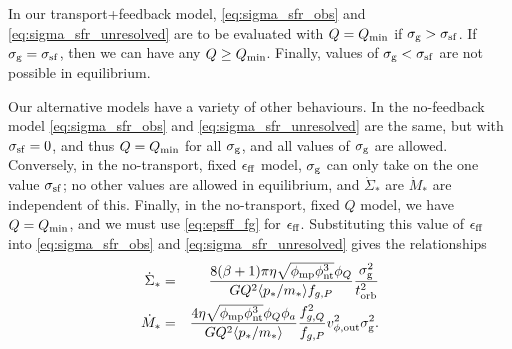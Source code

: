 \documentclass[useAMS,usenatbib]{mn2e}
\newcommand{\Qmin}{Q_{\rm min}}
\begin{document}
In our transport+feedback model, \autoref{eq:sigma_sfr_obs} and \autoref{eq:sigma_sfr_unresolved} are to be evaluated with $Q = \Qmin$ if $\sigma_{\rm g} > \sigma_{\rm sf}$. If $\sigma_{\rm g} = \sigma_{\rm sf}$, then we can have any $Q \geq Q_{\rm min}$. Finally, values of $\sigma_{\rm g} < \sigma_{\rm sf}$ are not possible in equilibrium.

Our alternative models have a variety of other behaviours. In the no-feedback model \autoref{eq:sigma_sfr_obs} and \autoref{eq:sigma_sfr_unresolved} are the same, but with $\sigma_{\rm sf} = 0$, and thus $Q = \Qmin$ for all $\sigma_{\rm g}$, and all values of $\sigma_{\rm g}$ are allowed. Conversely, in the no-transport, fixed $\epsilon_{\rm ff}$ model, $\sigma_{\rm g}$ can only take on the one value $\sigma_{\rm sf}$; no other values are allowed in equilibrium, and $\dot{\Sigma}_*$  are $\dot{M}_*$ are independent of this. Finally, in the no-transport, fixed $Q$ model, we have $Q = \Qmin$, and we must use \autoref{eq:epsff_fg} for $\epsilon_{\rm ff}$. Substituting this value of $\epsilon_{\rm ff}$ into \autoref{eq:sigma_sfr_obs} and \autoref{eq:sigma_sfr_unresolved} gives the relationships
\begin{eqnarray}
\dot{\Sigma}_* & = & \frac{8(\beta+1)\pi \eta \sqrt{\phi_{\rm mp} \phi_{\rm nt}^3} \phi_Q}{G Q^2 \langle p_*/m_*\rangle f_{g,P}} \frac{\sigma_{\rm g}^2}{t_{\rm orb}^2} \\
\dot{M}_* & = & \frac{4 \eta \sqrt{\phi_{\rm mp} \phi_{\rm nt}^3} \phi_Q \phi_a}{G Q^2 \langle p_*/m_*\rangle} \frac{f_{g,Q}^2}{f_{g,P}} v_{\phi,\rm out}^2 \sigma_{\rm g}^2.
\end{eqnarray}
\end{document}
